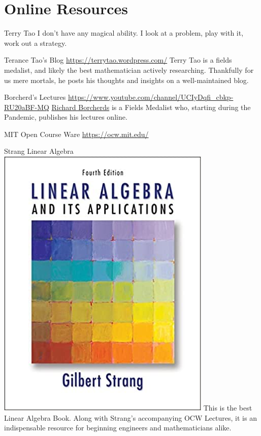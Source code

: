 \section{Online Resources}
\begin{boxQuote}{Terry Tao}
I don't have any magical ability. I look at a problem, play with it, work out a strategy.
\end{boxQuote}
\begin{boxResource}[]{Terance Tao's Blog}
\url{https://terrytao.wordpress.com/}
\tcblower
Terry Tao is a fields medalist, and likely the best mathematician actively researching.
Thankfully for us mere mortals, he posts his thoughts and insights on a well-maintained blog.
\end{boxResource}
%
\begin{boxResource}{Borcherd's Lectures}
\url{https://www.youtube.com/channel/UCIyDqfi_cbkp-RU20aBF-MQ}
\tcblower
\href{https://www.ias.edu/ideas/2013/roberts-monster}{Richard Borcherds} is a Fields Medalist who, starting during the Pandemic, publishes his lectures online.
\end{boxResource}
%
\begin{boxResource}{MIT Open Course Ware}
\url{https://ocw.mit.edu/}
\end{boxResource}
%
\begin{boxResource}[lefthand width=5cm, sidebyside]{Strang Linear Algebra}
\includegraphics[width=\textwidth]{./img/Strang_Linear}
\tcblower
This is the best Linear Algebra Book.
Along with Strang's accompanying OCW Lectures,
    it is an indispensable resource for beginning engineers and mathematicians alike.
\end{boxResource}
